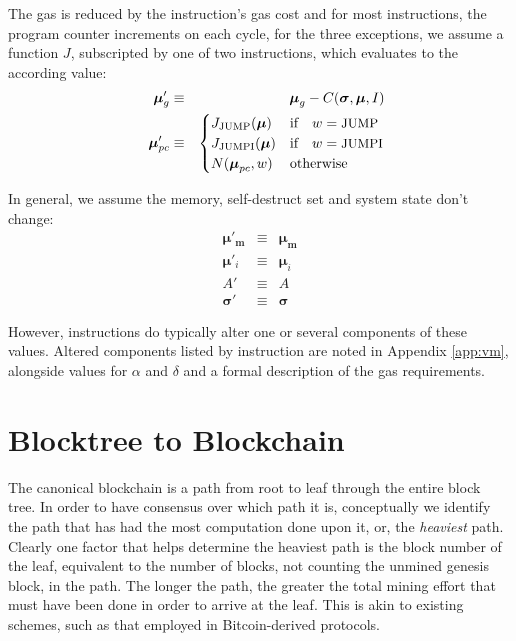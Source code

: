 \documentclass[9pt,oneside]{amsart}
\begin{document}
\begin{multicols}{2}
The gas is reduced by the instruction's gas cost and for most instructions, the program counter increments on each cycle, for the three exceptions, we assume a function $J$, subscripted by one of two instructions, which evaluates to the according value:
\begin{eqnarray}
\quad \boldsymbol{\mu}'_{g} & \equiv & \boldsymbol{\mu}_{g} - C(\boldsymbol{\sigma}, \boldsymbol{\mu}, I) \\
\quad \boldsymbol{\mu}'_{pc} & \equiv & \begin{cases}
J_{\text{JUMP}}(\boldsymbol{\mu}) & \text{if} \quad w = \text{\small JUMP} \\
J_{\text{JUMPI}}(\boldsymbol{\mu}) & \text{if} \quad w = \text{\small JUMPI} \\
N(\boldsymbol{\mu}_{pc}, w) & \text{otherwise}
\end{cases}
\end{eqnarray}

In general, we assume the memory, self-destruct set and system state don't change:
\begin{eqnarray}
\boldsymbol{\mu}'_\mathbf{m} & \equiv & \boldsymbol{\mu}_\mathbf{m} \\
\boldsymbol{\mu}'_i & \equiv & \boldsymbol{\mu}_i \\
A' & \equiv & A \\
\boldsymbol{\sigma}' & \equiv & \boldsymbol{\sigma}
\end{eqnarray}

However, instructions do typically alter one or several components of these values. Altered components listed by instruction are noted in Appendix \ref{app:vm}, alongside values for $\alpha$ and $\delta$ and a formal description of the gas requirements.

\section{Blocktree to Blockchain} \label{ch:ghost}

The canonical blockchain is a path from root to leaf through the entire block tree. In order to have consensus over which path it is, conceptually we identify the path that has had the most computation done upon it, or, the \textit{heaviest} path. Clearly one factor that helps determine the heaviest path is the block number of the leaf, equivalent to the number of blocks, not counting the unmined genesis block, in the path. The longer the path, the greater the total mining effort that must have been done in order to arrive at the leaf. This is akin to existing schemes, such as that employed in Bitcoin-derived protocols.


\end{multicols}
\end{document}
